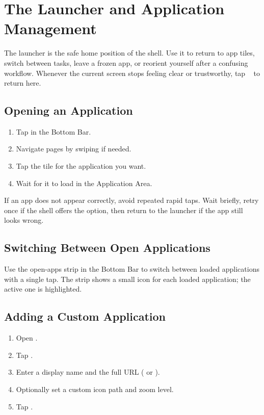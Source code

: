 \chapter{The Launcher and Application Management}
\label{ch:launcher}

The launcher is the safe home position of the shell.
Use it to return to app tiles, switch between tasks, leave a frozen app, or
reorient yourself after a confusing workflow.
Whenever the current screen stops feeling clear or trustworthy, tap
~ to return here.


\section{Opening an Application}

\begin{enumerate}
  \item Tap  in the Bottom Bar.
  \item Navigate pages by swiping if needed.
  \item Tap the tile for the application you want.
  \item Wait for it to load in the Application Area.
\end{enumerate}

If an app does not appear correctly, avoid repeated rapid taps.
Wait briefly, retry once if the shell offers the option, then return to the launcher
if the app still looks wrong.

\section{Switching Between Open Applications}

Use the open-apps strip in the Bottom Bar to switch between loaded applications
with a single tap.
The strip shows a small icon for each loaded application; the active one is
highlighted.

\section{Adding a Custom Application}

\begin{enumerate}
  \item Open .
  \item Tap .
  \item Enter a display name and the full URL ( or ).
  \item Optionally set a custom icon path and zoom level.
  \item Tap .
\end{enumerate}

